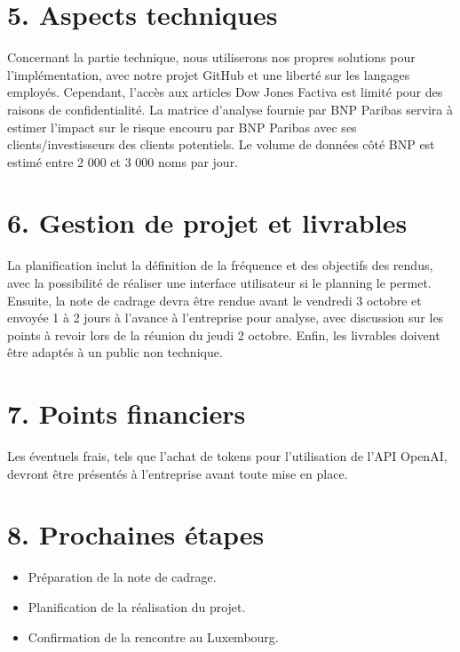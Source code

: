 \documentclass[a4paper,11pt]{article}
\begin{document}
\section*{5. Aspects techniques}
Concernant la partie technique, nous utiliserons nos propres solutions pour l’implémentation,
avec notre projet GitHub et une liberté sur les langages employés. Cependant, l’accès aux articles
Dow Jones Factiva est limité pour des raisons de confidentialité. La matrice d’analyse fournie
par BNP Paribas servira à estimer l'impact sur le risque encouru par BNP Paribas avec ses clients/investisseurs des clients potentiels. Le volume de données
côté BNP est estimé entre 2 000 et 3 000 noms par jour.


\section*{6. Gestion de projet et livrables}
La planification inclut la définition de la fréquence et des objectifs des rendus, avec la possibilité de réaliser une interface utilisateur si le planning le permet. Ensuite, la note de cadrage
devra être rendue avant le vendredi 3 octobre et envoyée 1 à 2 jours à l’avance à l’entreprise
pour analyse, avec discussion sur les points à revoir lors de la réunion du jeudi 2 octobre. Enfin,
les livrables doivent être adaptés à un public non technique.


\section*{7. Points financiers}
Les éventuels frais, tels que l'achat de tokens pour l'utilisation de l'API OpenAI, devront être présentés à l'entreprise avant toute mise en place.

\section*{8. Prochaines étapes}
\begin{itemize}
    \item Préparation de la note de cadrage.
    \item Planification de la réalisation du projet.
    \item Confirmation de la rencontre au Luxembourg.
\end{itemize}
\end{document}
